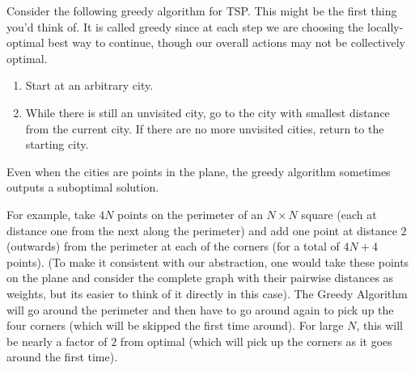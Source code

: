 \documentclass[12pt]{article}
\newcommand{\mfigure}[3]{\bigskip\centerline{\resizebox{#1}{#2}{\texttt{[image: \#3]}}}\bigskip}
\begin{document}
Consider the following greedy algorithm for TSP. This might be the first thing you'd think of. It is called greedy since at each step we are choosing the locally-optimal best way to continue, though our overall actions may not be collectively optimal.
\begin{enumerate}
\item Start at an arbitrary city.
\item While there is still an unvisited city, go to the city with smallest distance from the current city. If there are no more unvisited cities, return to the starting city.
\end{enumerate}

Even when the cities are points in the plane, the greedy algorithm sometimes outputs a suboptimal solution.


For example, take $4N$ points on the perimeter of an $N\times N$ square (each at distance one from the next along the perimeter) and add one point at distance $2$ (outwards) from the perimeter at each of the corners (for a total of $4N+4$ points). (To make it consistent with our abstraction, one would take these points on the plane and consider the complete graph with their pairwise distances as weights, but its easier to think of it directly in this case).  The Greedy Algorithm will go around the perimeter and then have to go
around again to pick up the four corners (which will be skipped the
first time around).  For large $N$, this will be nearly a factor of $2$ from optimal
(which will pick up the corners as it goes around the first time). 






\end{document}
